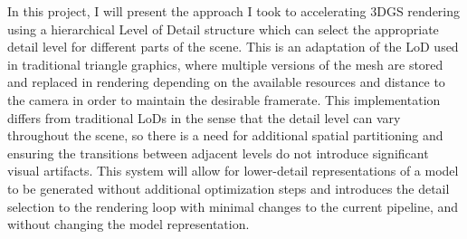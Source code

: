 In this project, I will present the approach I took to accelerating 3DGS rendering using a hierarchical Level of Detail structure which can select the appropriate detail level for different parts of the scene. This is an adaptation of the LoD used in traditional triangle graphics, where multiple versions of the mesh are stored and replaced in rendering depending on the available resources and distance to the camera in order to maintain the desirable framerate. This implementation differs from traditional LoDs in the sense that the detail level can vary throughout the scene, so there is a need for additional spatial partitioning and ensuring the transitions between adjacent levels do not introduce significant visual artifacts. This system will allow for lower-detail representations of a model to be generated without additional optimization steps and introduces the detail selection to the rendering loop with minimal changes to the current pipeline, and without changing the model representation. 